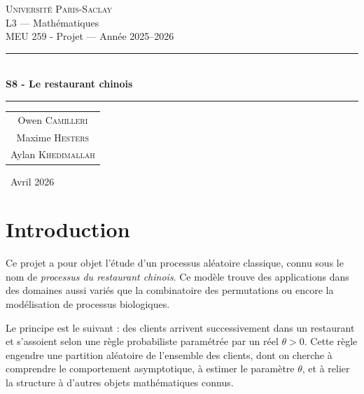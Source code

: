 \documentclass[12pt, a4paper]{article}
\theoremstyle{definition}
\theoremstyle{plain}
\begin{document}
\begin{titlepage}
  \centering
  \vspace*{1cm}

  {\large \textsc{Université Paris-Saclay}}\\[0.3cm]
  {\large L3 — Mathématiques}\\[0.3cm]
  {\normalsize MEU 259 - Projet — Année 2025–2026}

  \vspace{1.5cm}
  \rule{\linewidth}{0.5pt}\\[0.4cm]
  {\huge \bfseries S8 - Le restaurant chinois}\\[0.2cm]
  \rule{\linewidth}{0.5pt}

  \vspace{2cm}

  {\large
  \begin{tabular}{c}
    Owen \textsc{Camilleri} \\[0.5em]
    Maxime \textsc{Hesters} \\[0.5em]
    Aylan \textsc{Khedimallah}
  \end{tabular}
  }

  \vfill

  {\normalsize \ Avril 2026}
\end{titlepage}

\tableofcontents
\newpage

\section{Introduction}

Ce projet a pour objet l'étude d'un processus aléatoire classique, connu sous le nom de
\emph{processus du restaurant chinois}. Ce modèle trouve des applications dans des domaines
aussi variés que la combinatoire des permutations
ou encore la modélisation de processus biologiques.

Le principe est le suivant : des clients arrivent successivement dans un restaurant et
s'assoient selon une règle probabiliste paramétrée par un réel $\theta > 0$. Cette règle
engendre une partition aléatoire de l'ensemble des clients, dont on cherche à comprendre le
comportement asymptotique, à estimer le paramètre $\theta$, et à relier la structure à d'autres
objets mathématiques connus.
\end{document}
